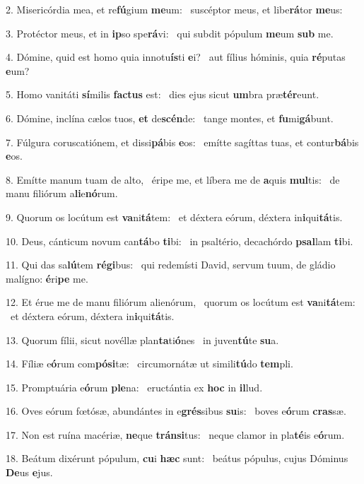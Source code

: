 2. Misericórdia mea, et re\textbf{fú}gium \textbf{me}um: \ast\  suscéptor meus, et libe\textbf{rá}tor \textbf{me}us:\

3. Protéctor meus, et in \textbf{ip}so spe\textbf{rá}vi: \ast\  qui subdit pópulum \textbf{me}um \textbf{sub} me.\

4. Dómine, quid est homo quia innotu\textbf{ís}ti \textbf{e}i? \ast\  aut fílius hóminis, quia \textbf{ré}putas \textbf{e}um?\

5. Homo vanitáti \textbf{sí}milis \textbf{fac}\textbf{tus} est: \ast\  dies ejus sicut \textbf{um}bra præ\textbf{tér}eunt.\

6. Dómine, inclína cælos tuos, \textbf{et} de\textbf{scén}de: \ast\  tange montes, et \textbf{fu}mi\textbf{gá}bunt.\

7. Fúlgura coruscatiónem, et dissi\textbf{pá}bis \textbf{e}os: \ast\  emítte sagíttas tuas, et contur\textbf{bá}bis \textbf{e}os.\

8. Emítte manum tuam de alto, \dag\  éripe me, et líbera me de \textbf{a}quis \textbf{mul}tis: \ast\  de manu filiórum a\textbf{li}e\textbf{nó}rum.\

9. Quorum os locútum est \textbf{va}ni\textbf{tá}tem: \ast\  et déxtera eórum, déxtera in\textbf{i}qui\textbf{tá}tis.\

10. Deus, cánticum novum can\textbf{tá}bo \textbf{ti}bi: \ast\  in psaltério, decachórdo \textbf{psal}lam \textbf{ti}bi.\

11. Qui das sa\textbf{lú}tem \textbf{ré}\textbf{gi}bus: \ast\  qui redemísti David, servum tuum, de gládio malígno: \textbf{é}ri\textbf{pe} me.\

12. Et érue me de manu filiórum alienórum, \dag\  quorum os locútum est \textbf{va}ni\textbf{tá}tem: \ast\  et déxtera eórum, déxtera in\textbf{i}qui\textbf{tá}tis.\

13. Quorum fílii, sicut novéllæ plan\textbf{ta}ti\textbf{ó}nes \ast\  in juven\textbf{tú}te \textbf{su}a.\

14. Fíliæ e\textbf{ó}rum com\textbf{pó}\textbf{si}tæ: \ast\  circumornátæ ut simili\textbf{tú}do \textbf{tem}pli.\

15. Promptuária e\textbf{ó}rum \textbf{ple}na: \ast\  eructántia ex \textbf{hoc} in \textbf{il}lud.\

16. Oves eórum fœtósæ, abundántes in e\textbf{grés}sibus \textbf{su}is: \ast\  boves e\textbf{ó}rum \textbf{cras}sæ.\

17. Non est ruína macériæ, \textbf{ne}que \textbf{tráns}\textbf{i}tus: \ast\  neque clamor in pla\textbf{té}is e\textbf{ó}rum.\

18. Beátum dixérunt pópulum, \textbf{cu}i \textbf{hæc} sunt: \ast\  beátus pópulus, cujus Dóminus \textbf{De}us \textbf{e}jus.\

